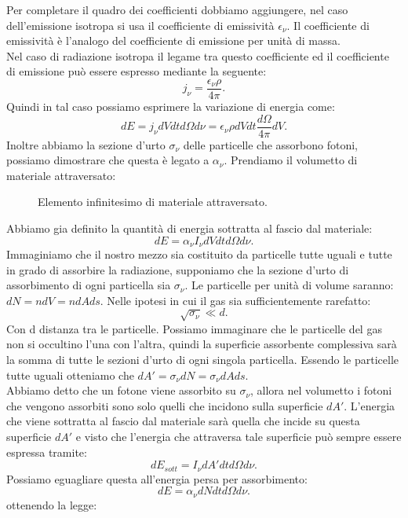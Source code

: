 Per completare il quadro dei coefficienti dobbiamo aggiungere, nel caso dell'emissione isotropa si usa il coefficiente di emissività $\epsilon _{\nu}$. Il coefficiente di emissività è l'analogo del coefficiente di emissione per unità di massa. \\
Nel caso di radiazione isotropa il legame tra questo coefficiente ed il coefficiente di emissione può essere espresso mediante la seguente:
\[
	j _{\nu} = \frac{\epsilon _{\nu} \rho }{4\pi}
.\] 
Quindi in tal caso possiamo esprimere la variazione di energia come:
\[
	dE = j _{\nu}dVdtd\Omega d\nu= \epsilon_{\nu}\rho dV dt \frac{d\Omega}{4\pi}dV
.\] 
Inoltre abbiamo la sezione d'urto $\sigma _{\nu} $ delle particelle che assorbono fotoni, possiamo dimostrare che questa è legato a $\alpha _{\nu} $. Prendiamo il volumetto di materiale attraversato:
\begin{figure}[H]
    \centering
    \caption{\scriptsize Elemento infinitesimo di materiale attraversato.}
    \label{fig:dimostrazione-sigma-nu}
\end{figure}
\noindent
Abbiamo gia definito la quantità di energia sottratta al fascio dal materiale:
\[
	dE = \alpha _{\nu} I_{\nu} dV dt d\Omega d\nu 
.\] 
Immaginiamo che il nostro mezzo sia costituito da particelle tutte uguali e tutte in grado di assorbire la radiazione, supponiamo che la sezione d'urto di assorbimento di ogni particella sia $\sigma _{\nu} $. Le particelle per unità di volume saranno: $dN = n dV = n dA ds$. Nelle ipotesi in cui il gas sia sufficientemente rarefatto:
\[
	\sqrt{\sigma _{\nu}} \ll d
.\] 
Con d distanza tra le particelle. Possiamo immaginare che le particelle del gas non si occultino l'una con l'altra, quindi la superficie assorbente complessiva sarà la somma di tutte le sezioni d'urto di ogni singola particella. Essendo le particelle tutte uguali otteniamo che $dA' = \sigma _{\nu} dN = \sigma _{\nu} dA ds$.\\
Abbiamo detto che un fotone viene assorbito su $\sigma _{\nu} $, allora nel volumetto i fotoni che vengono assorbiti sono solo quelli che incidono sulla superficie $dA'$. L'energia che viene sottratta al fascio dal materiale sarà quella che incide su questa superficie $dA'$ e visto che l'energia che attraversa tale superficie può sempre essere espressa tramite:
\[
	dE_{sott} = I_{\nu} dA' dt d\Omega d\nu 
.\] 
Possiamo eguagliare questa all'energia persa per assorbimento:
\[
	dE = \alpha _{\nu} dN dt d\Omega d\nu 
.\] 
ottenendo la legge:
